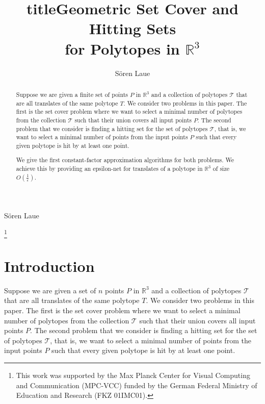 \documentclass{stacs_proc}
\newcommand{\bigO}{O}
\newcommand{\setR}{\mathbb{R}}
\newcommand{\T}{\mathcal{T}}
\begin{document}
\title[short title]{title}
\title[Geometric Set Cover and Hitting Sets for Polytopes in $\setR^3$]{Geometric Set
  Cover and Hitting Sets \\ for Polytopes in $\setR^3$}


\author{S\"{o}ren Laue}{S\"{o}ren Laue}
\address{Max-Planck-Institut f\"{u}r Informatik, Campus E1 4, 66123
Saarbr\"{u}cken, Germany}    \thanks{This work was supported by the Max Planck Center for Visual
  Computing and Communication (MPC-VCC) funded by the German Federal
  Ministry of Education and Research (FKZ 01IMC01).} 








\begin{abstract}
  \noindent 
  Suppose we are given a finite set of points $P$ in $\setR^3$ and a
  collection of polytopes $\T$ that are all translates of the same
  polytope $T$. We consider two problems in this paper. The first is
  the set cover problem where we want to select a minimal number of
  polytopes from the collection $\T$ such that their union covers all
  input points $P$. The second problem that we consider is finding a
  hitting set for the set of polytopes $\T$, that is, we want to
  select a minimal number of points from the input points $P$ such
  that every given polytope is hit by at least one point.
  
  We give the first constant-factor approximation algorithms for both
  problems. 
  We achieve this by providing an epsilon-net for translates of a
  polytope in $\setR^3$ of size $\bigO(\frac{1}{\epsilon})$. 
\end{abstract}

\maketitle





\vspace{-0.5cm}
\section*{Introduction}\label{S:one}
Suppose we are given a set of $n$ points $P$ in $\setR^3$ and a collection
of polytopes $\T$ that are all translates of the same polytope $T$. We
consider two problems in this paper. The first is the set cover
problem where we want to select a minimal number of polytopes from the
collection $\T$ such that their union covers all input points $P$. The
second problem that we consider is finding a hitting set for the set
of polytopes $\T$, that is, we want to select a minimal number of
points from the input points $P$ such that every given polytope is hit
by at least one point.   
\end{document}
